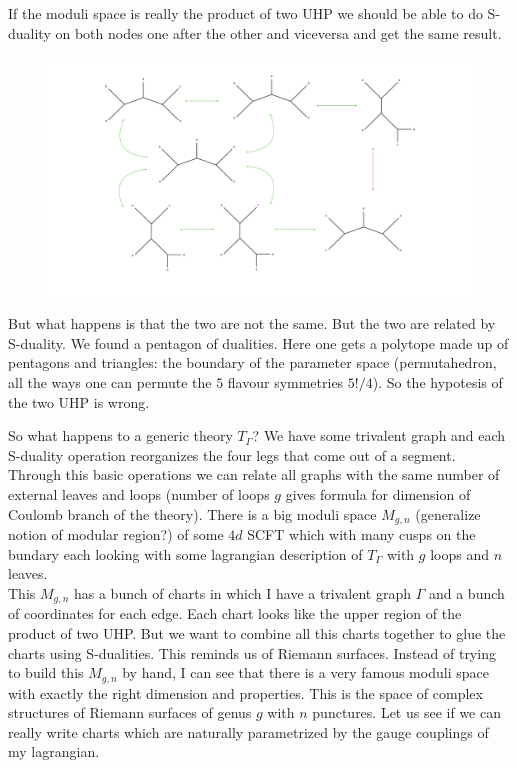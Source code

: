 \documentclass[11pt]{article}
\theoremstyle{definition}
\numberwithin{equation}{section}
\begin{document}
If the moduli space is really the product of two UHP we should be able to do S-duality on both nodes one after the other and viceversa and get the same result. 
\begin{figure}[H]
\includegraphics[width=\textwidth]{dualities.pdf}
\end{figure}
But what happens is that the two are not the same. But the two are related by S-duality. We found a pentagon of dualities. Here one gets a polytope made up of pentagons and triangles: the boundary of the parameter space (permutahedron, all the ways one can permute the $5$ flavour symmetries $5!/4$). So the hypotesis of the two UHP is wrong.

So what happens to a generic theory $T_{\Gamma}$? We have some trivalent graph and each S-duality operation reorganizes the four legs that come out of a segment. Through this basic operations we can relate all graphs with the same number of external leaves and loops (number of loops $g$ gives formula for dimension of Coulomb branch of the theory). There is a big moduli space $M_{g,n}$ (generalize notion of modular region?) of some $4d$ SCFT which with many cusps on the bundary each looking with some lagrangian description of $T_{\Gamma}$ with $g$ loops and $n$ leaves.\\
This $M_{g,n}$ has a bunch of charts in which I have a trivalent graph $\Gamma$ and a bunch of coordinates for each edge. Each chart looks like the upper region of the product of two UHP. But we want to combine all this charts together to glue the charts using S-dualities. This reminds us of Riemann surfaces. Instead of trying to build this $M_{g,n}$ by hand, I can see that there is a very famous moduli space with exactly the right dimension and properties. This is the space of complex structures of Riemann surfaces of genus $g$ with $n$ punctures. Let us see if we can really write charts which are naturally parametrized by the gauge couplings of my lagrangian.
\end{document}
